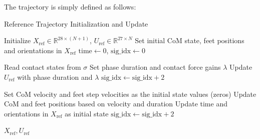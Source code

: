 \documentclass[main.tex]{subfiles}
\begin{document}
The trajectory is simply defined as follows:
\begin{algorithm}[H]
\caption{Reference Trajectory Initialization and Update}
\begin{algorithmic}[1]
\State Initialize $X_{\text{ref}} \in \mathbb{R}^{28 \times (N+1)}$, $U_{\text{ref}} \in \mathbb{R}^{27 \times N}$
\State Set initial CoM state, feet positions and orientations in $X_{\text{ref}}$
\State $\text{time} \gets 0$, $\text{sig\_idx} \gets 0$

    \State Read contact states from $\sigma$
    \State Set phase duration and contact force gains $\lambda$
    \State Update $U_{\text{ref}}$ with phase duration and $\lambda$
    \State $\text{sig\_idx} \gets \text{sig\_idx} + 2$
\EndFor

    \State Set CoM velocity and feet step velocities as the initial state values (zeros)
    \State Update CoM and feet positions based on velocity and duration
    \State Update time and orientations in $X_{\text{ref}}$ as initial state
    \State $\text{sig\_idx} \gets \text{sig\_idx} + 2$
\EndFor

\State \Return $X_{\text{ref}}, U_{\text{ref}}$
\end{algorithmic}
\end{algorithm}
\end{document}
